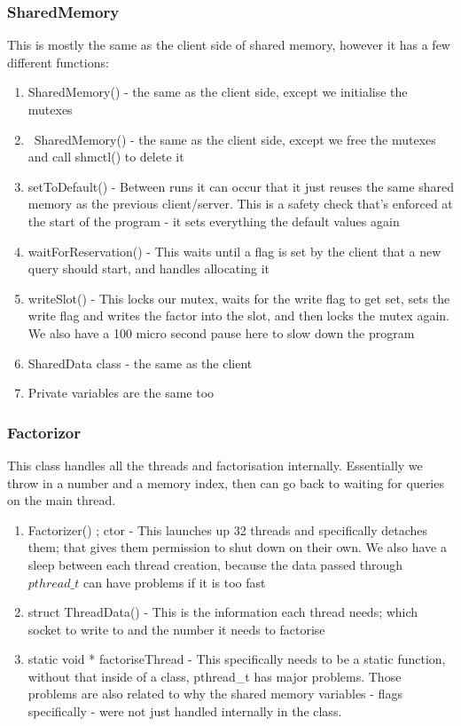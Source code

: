 \documentclass{article}
\begin{document}
    \subsubsection*{SharedMemory}
    This is mostly the same as the client side of shared memory, however it has
    a few different functions:
    \begin{enumerate}
        \item SharedMemory() - the same as the client side, except we initialise
        the mutexes
        \item ~SharedMemory() - the same as the client side, except we free
        the mutexes and call shmctl() to delete it
        \item setToDefault() - Between runs it can occur that it just reuses
        the same shared memory as the previous client/server. This is a safety
        check that's enforced at the start of the program - it sets everything
        the default values again
        \item waitForReservation() - This waits until a flag is set by the client
        that a new query should start, and handles allocating it
        \item writeSlot() - This locks our mutex, waits for the write flag to get
        set, sets the write flag and writes the factor into the slot, and then locks
        the mutex again. We also have a 100 micro second pause here to slow down the program
        \item SharedData class - the same as the client
        \item Private variables are the same too
    \end{enumerate}
    \subsubsection*{Factorizor}
    This class handles all the threads and factorisation internally.
    Essentially we throw in a number and a memory index, then can go back to waiting
    for queries on the main thread.
    \begin{enumerate}
        \item Factorizer() ; ctor - This launches up 32 threads and
        specifically detaches them;
        that gives them permission to shut down on their own.
        We also have a sleep between each thread creation, because the data passed
        through $pthread\_t$ can have problems if it is too fast
        \item struct ThreadData() - This is the information each thread needs;
        which socket to write to and the number it needs to factorise
        \item static void * factoriseThread - This specifically needs
        to be a static function, without that inside of a class, pthread\_t has
        major problems.
        Those problems are also related to why the shared memory variables - flags
        specifically - were not just handled internally in the class.
    \end{enumerate}
\end{document}
